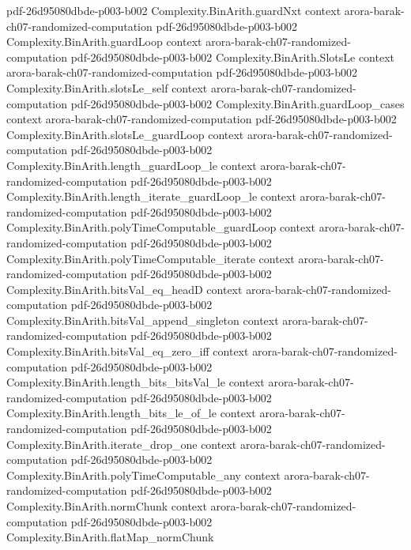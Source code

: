 \begin{theorem}
  {pdf-26d95080dbde-p003-b002}
\proofstep
  {Complexity.BinArith.guardNxt}
  {context}
  {arora-barak-ch07-randomized-computation}
  {pdf-26d95080dbde-p003-b002}
\proofstep
  {Complexity.BinArith.guardLoop}
  {context}
  {arora-barak-ch07-randomized-computation}
  {pdf-26d95080dbde-p003-b002}
\proofstep
  {Complexity.BinArith.SlotsLe}
  {context}
  {arora-barak-ch07-randomized-computation}
  {pdf-26d95080dbde-p003-b002}
\proofstep
  {Complexity.BinArith.slotsLe_self}
  {context}
  {arora-barak-ch07-randomized-computation}
  {pdf-26d95080dbde-p003-b002}
\proofstep
  {Complexity.BinArith.guardLoop_cases}
  {context}
  {arora-barak-ch07-randomized-computation}
  {pdf-26d95080dbde-p003-b002}
\proofstep
  {Complexity.BinArith.slotsLe_guardLoop}
  {context}
  {arora-barak-ch07-randomized-computation}
  {pdf-26d95080dbde-p003-b002}
\proofstep
  {Complexity.BinArith.length_guardLoop_le}
  {context}
  {arora-barak-ch07-randomized-computation}
  {pdf-26d95080dbde-p003-b002}
\proofstep
  {Complexity.BinArith.length_iterate_guardLoop_le}
  {context}
  {arora-barak-ch07-randomized-computation}
  {pdf-26d95080dbde-p003-b002}
\proofstep
  {Complexity.BinArith.polyTimeComputable_guardLoop}
  {context}
  {arora-barak-ch07-randomized-computation}
  {pdf-26d95080dbde-p003-b002}
\proofstep
  {Complexity.BinArith.polyTimeComputable_iterate}
  {context}
  {arora-barak-ch07-randomized-computation}
  {pdf-26d95080dbde-p003-b002}
\proofstep
  {Complexity.BinArith.bitsVal_eq_headD}
  {context}
  {arora-barak-ch07-randomized-computation}
  {pdf-26d95080dbde-p003-b002}
\proofstep
  {Complexity.BinArith.bitsVal_append_singleton}
  {context}
  {arora-barak-ch07-randomized-computation}
  {pdf-26d95080dbde-p003-b002}
\proofstep
  {Complexity.BinArith.bitsVal_eq_zero_iff}
  {context}
  {arora-barak-ch07-randomized-computation}
  {pdf-26d95080dbde-p003-b002}
\proofstep
  {Complexity.BinArith.length_bits_bitsVal_le}
  {context}
  {arora-barak-ch07-randomized-computation}
  {pdf-26d95080dbde-p003-b002}
\proofstep
  {Complexity.BinArith.length_bits_le_of_le}
  {context}
  {arora-barak-ch07-randomized-computation}
  {pdf-26d95080dbde-p003-b002}
\proofstep
  {Complexity.BinArith.iterate_drop_one}
  {context}
  {arora-barak-ch07-randomized-computation}
  {pdf-26d95080dbde-p003-b002}
\proofstep
  {Complexity.BinArith.polyTimeComputable_any}
  {context}
  {arora-barak-ch07-randomized-computation}
  {pdf-26d95080dbde-p003-b002}
\proofstep
  {Complexity.BinArith.normChunk}
  {context}
  {arora-barak-ch07-randomized-computation}
  {pdf-26d95080dbde-p003-b002}
\proofstep
  {Complexity.BinArith.flatMap_normChunk}

\end{theorem}
